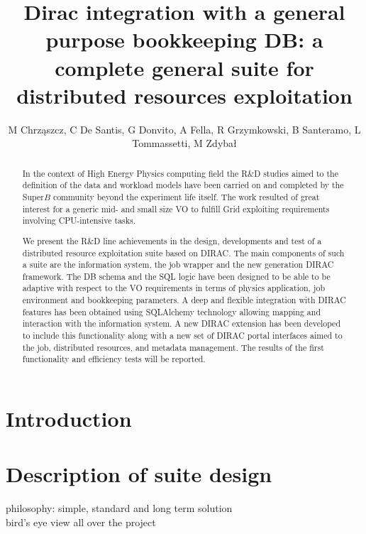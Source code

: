 \documentclass[a4paper]{jpconf}
\begin{document}
\title{Dirac integration with a general purpose bookkeeping DB: a complete general suite for distributed resources exploitation}

\author{M Chrząszcz, C De Santis, G Donvito, A Fella, R Grzymkowski, B Santeramo, L Tommassetti, M Zdybał}

%
%
%
%
%

\begin{abstract}
In the context of High Energy Physics computing field the R\&D studies aimed to
the definition of the data and workload models have been carried on and 
completed by the Super$B$ community beyond the experiment life itself.
The work resulted of great interest for a generic mid- and small size VO to 
fulfill Grid exploiting requirements involving CPU-intensive tasks.

We present the R\&D line achievements in the design, developments and test of a
distributed resource exploitation suite based on DIRAC. The main components of
such a suite are the information system, the job wrapper and the new generation
DIRAC framework. The DB schema and the SQL logic have been designed to be able
to be adaptive with respect to the VO requirements in terms of physics 
application, job environment and bookkeeping parameters. A deep and flexible 
integration with DIRAC features has been obtained using SQLAlchemy technology
allowing mapping and interaction with the information system. A new DIRAC
extension has been developed to include this functionality along with a new set
of DIRAC portal interfaces aimed to the job, distributed resources, and
metadata management. The results of the first functionality and efficiency
tests will be reported.
\end{abstract}

\section{Introduction}

\section{Description of suite design}
philosophy: simple, standard and long term solution\\
bird's eye view all over the project\\
 
\end{document}
